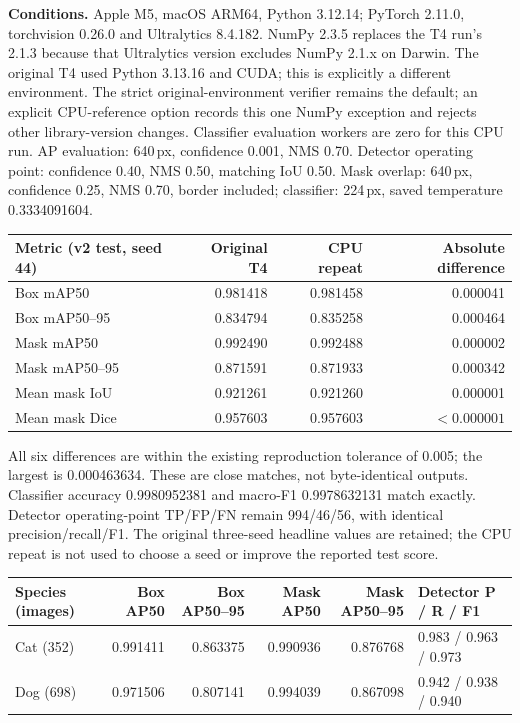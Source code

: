 \documentclass[11pt,a4paper]{article}
\begin{document}
\textbf{Conditions.} Apple M5, macOS ARM64, Python 3.12.14; PyTorch 2.11.0, torchvision 0.26.0 and Ultralytics 8.4.182. NumPy 2.3.5 replaces the T4 run's 2.1.3 because that Ultralytics version excludes NumPy 2.1.x on Darwin. The original T4 used Python 3.13.16 and CUDA; this is explicitly a different environment. The strict original-environment verifier remains the default; an explicit CPU-reference option records this one NumPy exception and rejects other library-version changes. Classifier evaluation workers are zero for this CPU run. AP evaluation: 640\,px, confidence 0.001, NMS 0.70. Detector operating point: confidence 0.40, NMS 0.50, matching IoU 0.50. Mask overlap: 640\,px, confidence 0.25, NMS 0.70, border included; classifier: 224\,px, saved temperature 0.3334091604.

\begin{tabularx}{\linewidth}{@{}Y r r r@{}}
\toprule
Metric (v2 test, seed 44) & Original T4 & CPU repeat & Absolute difference \\
\midrule
Box mAP50 & 0.981418 & 0.981458 & 0.000041 \\
Box mAP50--95 & 0.834794 & 0.835258 & 0.000464 \\
Mask mAP50 & 0.992490 & 0.992488 & 0.000002 \\
Mask mAP50--95 & 0.871591 & 0.871933 & 0.000342 \\
Mean mask IoU & 0.921261 & 0.921260 & 0.000001 \\
Mean mask Dice & 0.957603 & 0.957603 & $<0.000001$ \\
\bottomrule
\end{tabularx}

All six differences are within the existing reproduction tolerance of 0.005; the largest is 0.000463634. These are close matches, not byte-identical outputs. Classifier accuracy 0.9980952381 and macro-F1 0.9978632131 match exactly. Detector operating-point TP/FP/FN remain 994/46/56, with identical precision/recall/F1. The original three-seed headline values are retained; the CPU repeat is not used to choose a seed or improve the reported test score.

\begin{tabularx}{\linewidth}{@{}l r r r r Y@{}}
\toprule
Species (images) & Box AP50 & Box AP50--95 & Mask AP50 & Mask AP50--95 & Detector P / R / F1 \\
\midrule
Cat (352) & 0.991411 & 0.863375 & 0.990936 & 0.876768 & 0.983 / 0.963 / 0.973 \\
Dog (698) & 0.971506 & 0.807141 & 0.994039 & 0.867098 & 0.942 / 0.938 / 0.940 \\
\bottomrule
\end{tabularx}
\end{document}
